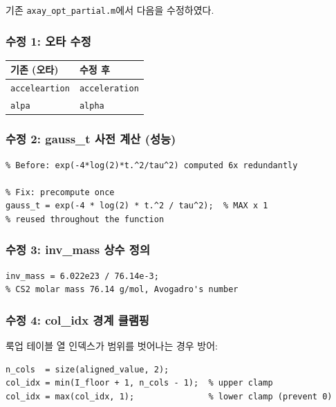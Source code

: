 \documentclass[11pt, a4paper]{article}
\begin{document}
기존 \texttt{axay\_opt\_partial.m}에서 다음을 수정하였다.

\subsubsection{수정 1: 오타 수정}

\begin{center}
\begin{tabular}{ll}
\toprule
기존 (오타) & 수정 후 \\
\midrule
\texttt{acceleartion} & \texttt{acceleration} \\
\texttt{alpa}         & \texttt{alpha} \\
\bottomrule
\end{tabular}
\end{center}

\subsubsection{수정 2: gauss\_t 사전 계산 (성능)}

\begin{lstlisting}
% Before: exp(-4*log(2)*t.^2/tau^2) computed 6x redundantly

% Fix: precompute once
gauss_t = exp(-4 * log(2) * t.^2 / tau^2);  % MAX x 1
% reused throughout the function
\end{lstlisting}

\subsubsection{수정 3: inv\_mass 상수 정의}

\begin{lstlisting}
inv_mass = 6.022e23 / 76.14e-3;
% CS2 molar mass 76.14 g/mol, Avogadro's number
\end{lstlisting}

\subsubsection{수정 4: col\_idx 경계 클램핑}

룩업 테이블 열 인덱스가 범위를 벗어나는 경우 방어:

\begin{lstlisting}
n_cols  = size(aligned_value, 2);
col_idx = min(I_floor + 1, n_cols - 1);  % upper clamp
col_idx = max(col_idx, 1);               % lower clamp (prevent 0)
\end{lstlisting}
\end{document}
